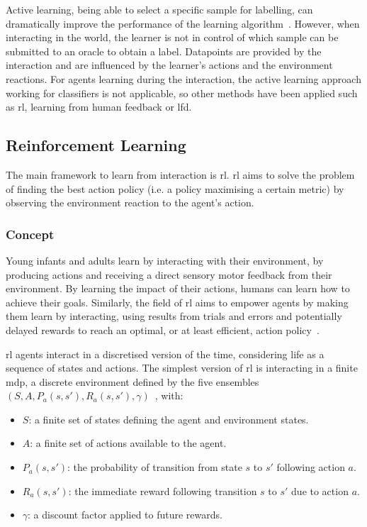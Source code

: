 Active learning, being able to select a specific sample for labelling, can dramatically improve the performance of the learning algorithm~\citep{settles2012active}. However, when interacting in the world, the learner is not in control of which sample can be submitted to an oracle to obtain a label. Datapoints are provided by the interaction and are influenced by the learner's actions and the environment reactions. For agents learning during the interaction, the active learning approach working for classifiers is not applicable, so other methods have been applied such as \gls{rl}, learning from human feedback or \gls{lfd}.

\subsection{Reinforcement Learning} \label{ssec:back_rl}

The main framework to learn from interaction is \acrfull{rl}. \gls{rl} aims to solve the problem of finding the best action policy (i.e. a policy maximising a certain metric) by observing the environment reaction to the agent's action.

\subsubsection{Concept} 
	Young infants and adults learn by interacting with their environment, by producing actions and receiving a direct sensory motor feedback from their environment. By learning the impact of their actions, humans can learn how to achieve their goals. Similarly, the field of \gls{rl} aims to empower agents by making them learn by interacting, using results from trials and errors and potentially delayed rewards to reach an optimal, or at least efficient, action policy~\citep{sutton1998reinforcement}. 

	\gls{rl} agents interact in a discretised version of the time, considering life as a sequence of states and actions. The simplest version of \gls{rl} is interacting in a finite \gls{mdp}, a discrete environment defined by the five ensembles $(S, A, P_a(s,s'), R_a(s,s'), \gamma)$~\citep{howard1960dynamic}, with:
	\begin{itemize}
		\item $S$: a finite set of states defining the agent and environment states.
		\item $A$: a finite set of actions available to the agent.
		\item $P_a(s,s')$: the probability of transition from state $s$ to $s'$ following action $a$.
		\item $R_a(s,s')$: the immediate reward following transition $s$ to $s'$ due to action $a$.
		\item $\gamma$: a discount factor applied to future rewards.
	\end{itemize}
	
